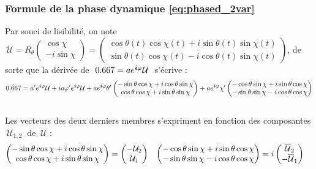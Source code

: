 \subsubsection{Formule de la phase dynamique \eqref{eq:phased_2var}}

Par souci de lisibilité, on note $\ \mathcal{U} = R_{\theta} \begin{pmatrix} \cos\chi \\ -i\sin\chi \end{pmatrix} = \begin{pmatrix} \cos\theta(t) \cos\chi(t) + i\sin\theta(t) \sin\chi(t) \\ \sin\theta(t) \cos\chi(t) - i\cos\theta(t) \sin\chi(t) \end{pmatrix}$, de sorte que la dérivée de $\ \x=ae^{\i \varphi}\mathcal{U}\ $ s'écrive :
\[\dot{\x} = a'e^{\i \varphi}\mathcal{U} + ia\varphi'e^{\i \varphi} \mathcal{U} + ae^{\i \varphi}\theta'\begin{pmatrix} -\sin\theta \cos\chi + i\cos\theta \sin\chi \\ \cos\theta \cos\chi + i\sin\theta \sin\chi \end{pmatrix} + ae^{\i \varphi}\chi'\begin{pmatrix} -\cos\theta \sin\chi + i\sin\theta \cos\chi \\ -\sin\theta \sin\chi - i\cos\theta \cos\chi \end{pmatrix}\]
\\
Les vecteurs des deux derniers membres s'expriment en fonction des composantes $\ \mathcal{U}_{1,2}\ $ de $\ \mathcal{U}$ :
\begin{align*}
	\begin{pmatrix} -\sin\theta \cos\chi + i\cos\theta \sin\chi \\ \cos\theta \cos\chi + i\sin\theta \sin\chi \end{pmatrix} &= \begin{pmatrix} -\mathcal{U}_2 \\ \mathcal{U}_1 \end{pmatrix}  &
	\begin{pmatrix} -\cos\theta \sin\chi + i\sin\theta \cos\chi \\ -\sin\theta \sin\chi - i\cos\theta \cos\chi \end{pmatrix} &= i\begin{pmatrix} \overline{\mathcal{U}}_2 \\ -\overline{\mathcal{U}}_1 \end{pmatrix}
\end{align*}
